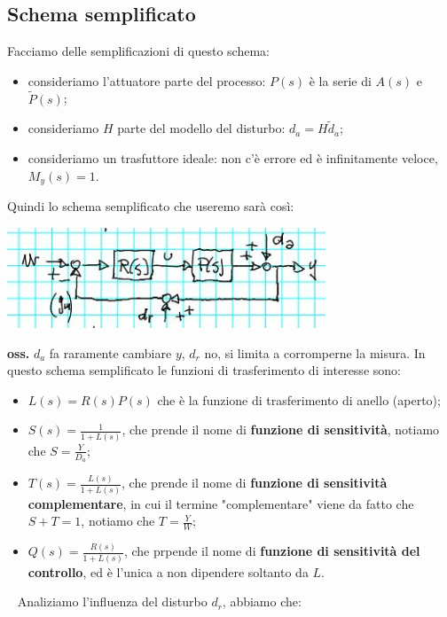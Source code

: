 \subsection{Schema semplificato}
Facciamo delle semplificazioni di questo schema:
\begin{itemize}
    \item consideriamo l'attuatore parte del processo: $P(s)$ è la serie di $A(s)$ e $\tilde{P}(s)$;
    \item consideriamo $H$ parte del modello del disturbo: $d_a = H \tilde{d}_a$;
    \item consideriamo un trasfuttore ideale: non c'è errore ed è infinitamente veloce, $M_y(s) = 1$.
\end{itemize}
Quindi lo schema semplificato che useremo sarà così:
\begin{center}
    \includegraphics[height=3cm]{../lezione18/img2.JPG}
\end{center}
\textbf{oss.} $d_a$ fa raramente cambiare $y$, $d_r$ no, si limita a corromperne la misura.\newline
\newline
In questo schema semplificato le funzioni di trasferimento di interesse sono:
\begin{itemize}
    \item $L(s) = R(s)P(s)$ che è la funzione di trasferimento di anello (aperto);
    \item $S(s) = \frac{1}{1+L(s)}$, che prende il nome di \textbf{funzione di sensitività}, notiamo che $S= \frac{Y}{D_a}$;
    \item $T(s) = \frac{L(s)}{1+L(s)}$, che prende il nome di \textbf{funzione di sensitività complementare}, in cui il termine "complementare" viene da fatto che $S+T = 1$, notiamo che $T = \frac{Y}{W}$;
    \item $Q(s) = \frac{R(s)}{1+L(s)}$, che prpende il nome di \textbf{funzione di sensitività del controllo}, ed è l'unica a non dipendere soltanto da $L$.
\end{itemize}
\ \newline
Analiziamo l'influenza del disturbo $d_r$, abbiamo che:\newline
